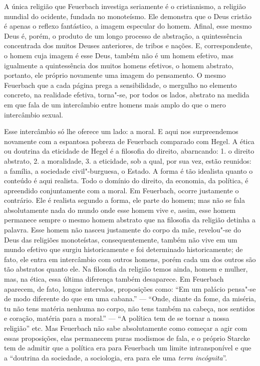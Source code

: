 A única religião
que Feuerbach investiga
seriamente é o cristianismo, a religião mundial do ocidente, fundada no
monoteísmo. Ele demonstra que o Deus cristão é apenas o reflexo
fantástico, a imagem especular do homem. Afinal, esse mesmo Deus é,
porém, o produto de um longo processo de abstração, a quintessência
concentrada dos muitos Deuses anteriores, de tribos e nações. E,
correspondente, o homem cuja imagem é esse Deus, também não é um homem
efetivo, mas igualmente a quintessência dos muitos homens efetivos, o
homem abstrato, portanto, ele próprio novamente uma imagem do
pensamento. O
mesmo Feuerbach que
a cada página prega a sensibilidade, o mergulho no elemento concreto, na
realidade efetiva, torna"-se, por todos os lados, abstrato na medida em
que fala de um intercâmbio entre homens mais amplo do que o mero
intercâmbio sexual.

Esse intercâmbio só lhe oferece um lado: a moral. E aqui nos
surpreendemos novamente com a espantosa pobreza
de Feuerbach comparado
com Hegel.
A ética ou doutrina da eticidade de Hegel é a filosofia do direito,
abarncando: 1. o direito abstrato, 2. a moralidade, 3. a eticidade, sob
a qual, por sua vez, estão reunidos: a família, a sociedade
civil"-burguesa, o Estado. A forma é tão idealista quanto o conteúdo é
aqui realista. Todo o domínio do direito, da economia, da política, é
apreendido conjuntamente com a moral.
Em Feuerbach,
ocorre justamente o contrário. Ele é realista segundo a forma, ele parte
do homem; mas não se fala absolutamente nada do mundo onde esse homem
vive e, assim, esse homem permanece sempre o mesmo homem abstrato que na
filosofia da religião detinha a palavra. Esse homem não nasceu
justamente do corpo da mãe, revelou"-se do Deus das religiões
monoteístas, consequentemente, também não vive em um mundo efetivo que
surgiu historicamente e foi determinado historicamente; de fato, ele
entra em intercâmbio com outros homens, porém cada um dos outros são tão
abstratos quanto ele. Na filosofia da religião temos ainda, homem e
mulher, mas, na ética, essa última diferença também desaparece.
Em Feuerbach
aparecem, de fato, longos intervalos, proposições como: ``Em um palácio
pensa"-se de modo diferente do que em uma cabana.'' --- ``Onde, diante da
fome, da miséria, tu não tens matéria nenhuma no corpo, não tens também
na cabeça, nos sentidos e coração, matéria
para a moral.'' --- ``A política tem de se tornar a nossa
religião'' etc.
Mas Feuerbach não
sabe absolutamente como começar a agir com essas proposições, elas
permanecem puras modismos de fala, e o próprio Starcke tem de admitir
que a política era
para Feuerbach um
limite intransponível e que a ``doutrina da sociedade, a sociologia, era
para ele uma \emph{terra
incógnita}''.

